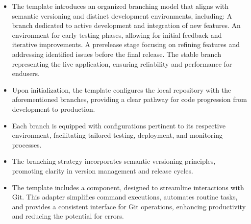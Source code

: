 \documentclass[letterpaper,10pt,english]{sphinxhowto}
\begin{document}
\label{\detokenize{templates/git/index:key-features}}\begin{itemize}
\item {} 
\sphinxAtStartPar
{} The template introduces an organized branching model that aligns with semantic versioning and distinct development environments, including:
\sphinxhyphen{}  A branch dedicated to active development and integration of new features.
\sphinxhyphen{}  An environment for early testing phases, allowing for initial feedback and iterative improvements.
\sphinxhyphen{}  A pre\sphinxhyphen{}release stage focusing on refining features and addressing identified issues before the final release.
\sphinxhyphen{}  The stable branch representing the live application, ensuring reliability and performance for end\sphinxhyphen{}users.

\item {} 
\sphinxAtStartPar
{} Upon initialization, the template configures the local repository with the aforementioned branches, providing a clear pathway for code progression from development to production.

\item {} 
\sphinxAtStartPar
{} Each branch is equipped with configurations pertinent to its respective environment, facilitating tailored testing, deployment, and monitoring processes.

\item {} 
\sphinxAtStartPar
{} The branching strategy incorporates semantic versioning principles, promoting clarity in version management and release cycles.

\item {} 
\sphinxAtStartPar
{} The template includes a  component, designed to streamline interactions with Git. This adapter simplifies command executions, automates routine tasks, and provides a consistent interface for Git operations, enhancing productivity and reducing the potential for errors.

\end{itemize}
\end{document}
